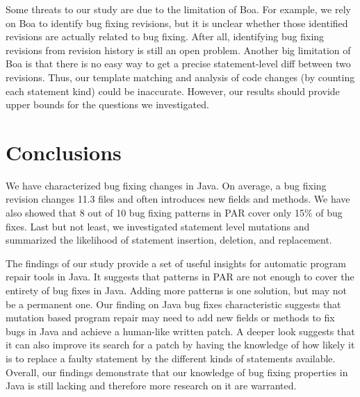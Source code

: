 \documentclass{sig-alternate-05-2015}
\begin{document}
Some threats to our study are due to the limitation of Boa. For example, we rely
on Boa to identify bug fixing revisions, but it is unclear whether those
identified revisions are actually related to bug fixing. After all, identifying
bug fixing revisions from revision history is still an open problem. Another big
limitation of Boa is that there is no easy way to get a precise statement-level
diff between two revisions. Thus, our template matching and analysis of code
changes (by counting each statement kind) could be inaccurate. However, our
results should provide upper bounds for the questions we investigated. 

\section{Conclusions}
We have characterized bug fixing changes in Java.
On average, a bug fixing revision changes 11.3 files and often introduces new
fields and methods. We have also showed that 8 out of 10 bug fixing patterns in
PAR cover only 15\% of bug fixes. Last but not least, we investigated statement
level mutations and summarized the likelihood of statement insertion, deletion,
and replacement. 

The findings of our study provide a set of useful insights for automatic
program repair tools in Java. It suggests that patterns in PAR are not enough to
cover the entirety of bug fixes in Java. Adding more patterns is one solution,
but may not be a permanent one. Our finding on Java bug fixes characteristic suggests that mutation based program repair may need to add new fields or methods
to fix bugs in Java and achieve a human-like written patch. A deeper look suggests
that it can also improve its search for a patch by having the knowledge of how
likely it is to replace a faulty statement by the different kinds of statements
available. Overall, our findings demonstrate that our knowledge of bug fixing
properties in Java is still lacking and therefore more research on it are
warranted.






%
%


\end{document}
